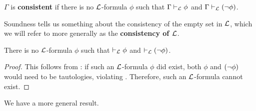 \begin{boxdefinition}[Consistency]\label{Ch1:Def:Consistent}
    $\Gamma$ is \textbf{consistent} if there is no $\L$-formula $\phi$ such that $\Gamma \vdash_{\mathcal{L}} \phi$ and $\Gamma \vdash_{\mathcal{L}} \left( \neg \phi \right)$.
\end{boxdefinition}

Soundness tells us something about the consistency of the empty set in $\L$, which we will refer to more generally as the \textbf{consistency of $\L$}.

\begin{boxtheorem}[Consistency of $\L$]
    There is no $\L$-formula $\phi$ such that $\vdash_{\mathcal{L}} \phi$ and $\vdash_{\mathcal{L}} \left( \neg \phi \right)$.
\end{boxtheorem}
\begin{proof}
    This follows from : if such an $\L$-formula $\phi$ did exist, both $\phi$ and $\left( \neg \phi \right)$ would need to be tautologies, violating . Therefore, such an $\L$-formula cannot exist.
\end{proof}

We have a more general result.

